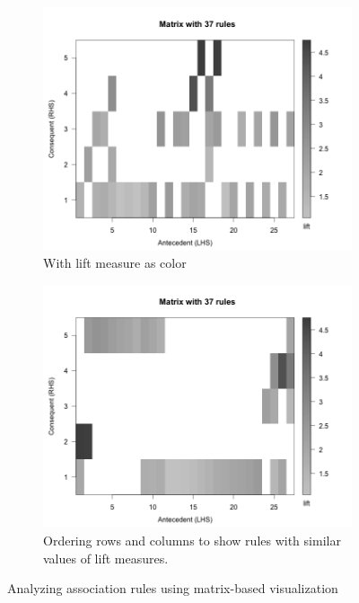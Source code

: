 \documentclass{article}
\begin{document}
\begin{figure}[h!]
\begin{subfigure}{.5\textwidth}
  \centering
  \includegraphics[width=1.1\linewidth]{images/matrix}
  \caption{With lift measure as color}
  \label{fig:matrix}
\end{subfigure}%
\begin{subfigure}{.5\textwidth}
  \centering
  \includegraphics[width=1.1\linewidth]{images/matrix2}
  \caption{Ordering rows and columns to show rules with similar values of lift measures.}
  \label{fig:sorted_matrix}
\end{subfigure}
\caption{Analyzing association rules using matrix-based visualization}
\end{figure}
\end{document}
